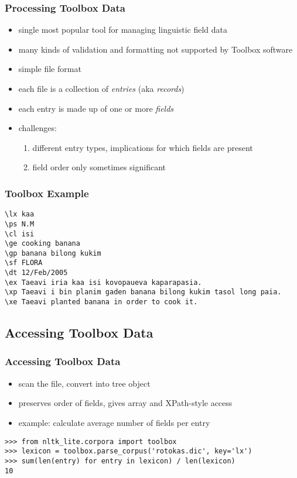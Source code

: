 \documentclass{beamer}             %
\begin{document}
\begin{frame}
\frametitle{Processing Toolbox Data}

\begin{itemize}
\item single most popular tool for managing linguistic field data
\item many kinds of validation and formatting not supported by Toolbox software
\item simple file format
\item each file is a collection of \textit{entries} (aka
  \textit{records})
\item each entry is made up of one or more \textit{fields}
\item challenges:
  \begin{enumerate}
  \item different entry types, implications for which fields are present
  \item field order only sometimes significant
  \end{enumerate}
\end{itemize}
\end{frame}

\begin{frame}[fragile]
\frametitle{Toolbox Example}
\small

\begin{verbatim}
\lx kaa
\ps N.M
\cl isi
\ge cooking banana
\gp banana bilong kukim
\sf FLORA
\dt 12/Feb/2005
\ex Taeavi iria kaa isi kovopaueva kaparapasia.
\xp Taeavi i bin planim gaden banana bilong kukim tasol long paia.
\xe Taeavi planted banana in order to cook it.
\end{verbatim}
\end{frame}

\subsection{Accessing Toolbox Data}

\begin{frame}[fragile]
\frametitle{Accessing Toolbox Data}

\begin{itemize}
\item scan the file, convert into tree object
\item preserves order of fields, gives array and XPath-style access
\item example: calculate average number of fields per entry
\end{itemize}

\begin{verbatim}
>>> from nltk_lite.corpora import toolbox
>>> lexicon = toolbox.parse_corpus('rotokas.dic', key='lx')
>>> sum(len(entry) for entry in lexicon) / len(lexicon)
10
\end{verbatim}
\end{frame}
\end{document}
